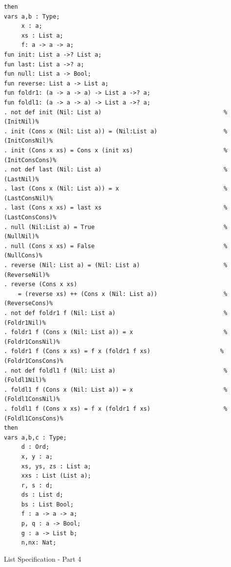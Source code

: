 \documentclass[12pt,twoside]{article}
\numberwithin{spec}{subsection}
\numberwithin{proof}{subsection}
\numberwithin{figure}{subsection}
\numberwithin{code}{subsection}
\begin{document}
\addtocounter{spec}{-1}
\begin{spec}
\begin{verbatim}
then
vars a,b : Type;
     x : a;
     xs : List a;
     f: a -> a -> a;
fun init: List a ->? List a;
fun last: List a ->? a;
fun null: List a -> Bool;
fun reverse: List a -> List a;
fun foldr1: (a -> a -> a) -> List a ->? a;
fun foldl1: (a -> a -> a) -> List a ->? a;
. not def init (Nil: List a)                                   %(InitNil)%
. init (Cons x (Nil: List a)) = (Nil:List a)                   %(InitConsNil)%
. init (Cons x xs) = Cons x (init xs)                          %(InitConsCons)%
. not def last (Nil: List a)                                   %(LastNil)%
. last (Cons x (Nil: List a)) = x                              %(LastConsNil)%
. last (Cons x xs) = last xs                                   %(LastConsCons)%
. null (Nil:List a) = True                                     %(NullNil)%
. null (Cons x xs) = False                                     %(NullCons)%
. reverse (Nil: List a) = (Nil: List a)                        %(ReverseNil)%
. reverse (Cons x xs) 
    = (reverse xs) ++ (Cons x (Nil: List a))                   %(ReverseCons)%
. not def foldr1 f (Nil: List a)                               %(Foldr1Nil)%
. foldr1 f (Cons x (Nil: List a)) = x                          %(Foldr1ConsNil)%
. foldr1 f (Cons x xs) = f x (foldr1 f xs)                    %(Foldr1ConsCons)%
. not def foldl1 f (Nil: List a)                               %(Foldl1Nil)%
. foldl1 f (Cons x (Nil: List a)) = x                          %(Foldl1ConsNil)%
. foldl1 f (Cons x xs) = f x (foldr1 f xs)                     %(Foldl1ConsCons)%
then
vars a,b,c : Type;
     d : Ord;
     x, y : a;
     xs, ys, zs : List a;
     xxs : List (List a);
     r, s : d;
     ds : List d;
     bs : List Bool;
     f : a -> a -> a;
     p, q : a -> Bool;
     g : a -> List b;
     n,nx: Nat;
\end{verbatim}
\caption{List Specification - Part 4}
\end{spec}
\end{document}
